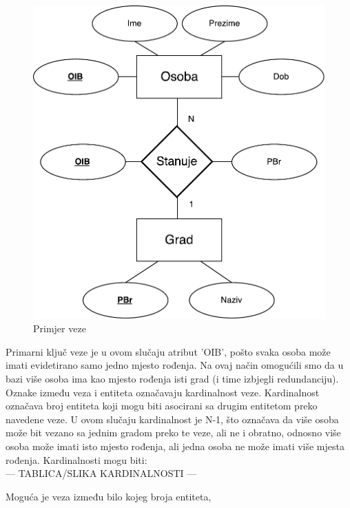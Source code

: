 \documentclass[times, utf8, zavrsni]{fer}
\begin{document}
\begin{figure}[H]
\centering
\includegraphics[scale=0.7]{img/veza.pdf}
\caption{Primjer veze}
\label{fig:veza}
\end{figure}

Primarni ključ veze je u ovom slučaju atribut 'OIB', pošto svaka osoba može imati evidetirano samo jedno mjesto rođenja. Na ovaj način omogućili smo da u bazi više osoba ima kao mjesto rođenja isti grad (i time izbjegli redundanciju). Oznake između veza i entiteta označavaju kardinalnost veze. Kardinalnost označava broj entiteta koji mogu biti asocirani sa drugim entitetom preko navedene veze. U ovom slučaju kardinalnost je N-1, što označava da više osoba može bit vezano sa jednim gradom preko te veze, ali ne i obratno, odnosno više osoba može imati isto mjesto rođenja, ali jedna osoba ne može imati više mjesta rođenja. Kardinalnosti mogu biti:\\

--- TABLICA/SLIKA KARDINALNOSTI ---\clearpage

Moguća je veza između bilo kojeg broja entiteta,\\
\end{document}
